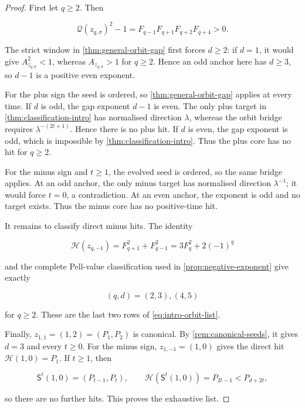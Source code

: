 \begin{proof}
First let $q\geqslant2$. Then

\begin{equation}
 \mathcal Q(z_{q,\sigma})^2-1
 =F_{q-1}F_{q+1}F_{q+2}F_{q+4}>0.
 \label{eq:core-noncanonical}
\end{equation}

The strict window in \cref{thm:general-orbit-gap} first forces
$d\geqslant2$: if $d=1$, it would give
$A_{z_{q,\sigma}}^2<1$, whereas $A_{z_{q,\sigma}}>1$ for
$q\geqslant2$. Hence an odd anchor here has $d\geqslant3$, so $d-1$ is a
positive even exponent.

For the plus sign the seed is ordered, so
\cref{thm:general-orbit-gap} applies at every time. If $d$ is odd, the gap
exponent $d-1$ is even. The only plus target in
\cref{thm:classification-intro} has normalised direction $\lambda$, whereas
the orbit bridge requires $\lambda^{-(2t+1)}$. Hence there is no plus hit.
If $d$ is even, the gap exponent is odd, which is impossible by
\cref{thm:classification-intro}. Thus the plus core has no hit for
$q\geqslant2$.

For the minus sign and $t\geqslant1$, the evolved seed is ordered, so the
same bridge applies. At an odd anchor, the only minus target has normalised
direction $\lambda^{-1}$; it would force $t=0$, a contradiction. At an even
anchor, the exponent is odd and no target exists. Thus the minus core has no
positive-time hit.

It remains to classify direct minus hits. The identity

\begin{equation}
 \mathcal H(z_{q,-1})
 =F_{q+1}^2+F_{q-1}^2
 =3F_q^2+2(-1)^q
 \label{eq:minus-direct-height}
\end{equation}

and the complete Pell-value classification used in
\cref{prop:negative-exponent} give exactly

\begin{equation}
 (q,d)=(2,3),(4,5)
 \label{eq:minus-direct-hits}
\end{equation}

for $q\geqslant2$. These are the last two rows of
\cref{eq:intro-orbit-list}.

Finally, $z_{1,1}=(1,2)=(P_1,P_2)$ is canonical. By
\cref{rem:canonical-seeds}, it gives $d=3$ and every $t\geqslant0$.
For the minus sign, $z_{1,-1}=(1,0)$ gives the direct hit
$\mathcal H(1,0)=P_1$. If $t\geqslant1$, then

\begin{equation}
 \mathsf S^t(1,0)=(P_{t-1},P_t),
 \qquad
 \mathcal H(\mathsf S^t(1,0))=P_{2t-1}<P_{d+2t},
\end{equation}

so there are no further hits. This proves the exhaustive list.
\end{proof}


